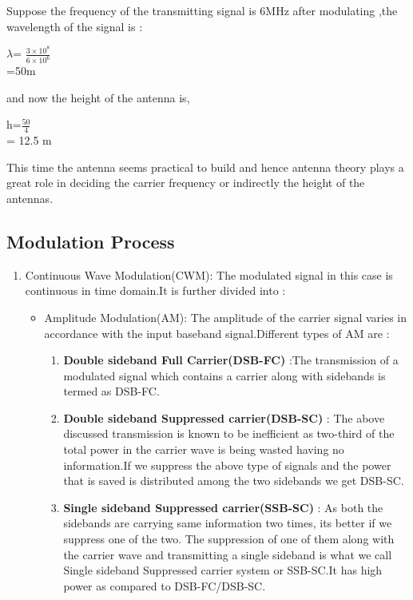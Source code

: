 \documentclass[12pt,a4paper]{article}%
\begin{document}
\begin{flushleft}
\begin{flushleft}
			Suppose the frequency of the transmitting signal is 6MHz after modulating ,the wavelength of the signal is :
			\begin{center}
				$\lambda$= $\frac{3\times 10^8}{6 \times 10^6}$  \\\bigskip
				=50m 
			\end{center}
			and now the height of the antenna is,
			\begin{center}
				h=$\frac{50}{4}$     \\\bigskip
				= 12.5 m
			\end{center}
			This time the antenna seems practical to build and hence antenna theory plays a great role in deciding the carrier frequency or indirectly the height of the antennas.
		\end{flushleft}
		\subsection{Modulation Process}
		\begin{flushleft}
			\fontsize{12pt}{18pt}\selectfont
			\begin{enumerate}
				\item  {\large Continuous Wave Modulation(CWM): }The modulated signal in this case is continuous in time domain.It is further divided into : \\\bigskip
				\begin{itemize}
					\item {\fontsize{14pt}{20pt}\selectfont Amplitude Modulation(AM): } The amplitude of the carrier signal varies in accordance with the input baseband signal.Different types of AM are : \\\bigskip
					\begin{enumerate}
						\item \textbf{Double sideband Full Carrier(DSB-FC) }:The transmission of a modulated signal which contains a carrier along with sidebands is termed as DSB-FC.
						
						\item \textbf{Double sideband Suppressed carrier(DSB-SC) }: The above discussed transmission is known to be inefficient as two-third of the total power in the carrier wave is being wasted having no information.If we suppress the above type of signals and the power that is saved is distributed among the two sidebands we get DSB-SC.
						
						\item \textbf{ Single sideband Suppressed carrier(SSB-SC) }: As both the sidebands are  carrying same information two times, its better if we suppress one of the two. The suppression of one of them along with the carrier wave and transmitting a single sideband is what we call Single sideband Suppressed carrier system or SSB-SC.It has high power as compared to DSB-FC/DSB-SC.
						

\end{enumerate}
\end{itemize}
\end{enumerate}
\end{flushleft}
\end{flushleft}
\end{document}
